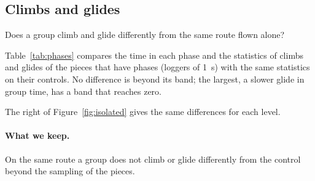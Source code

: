 \subsection{Climbs and glides}\label{sec:phases}

Does a group climb and glide differently from the same route flown alone?

Table~\ref{tab:phases} compares the time in each phase and the statistics of climbs and glides of the
pieces that have phases (loggers of 1~s) with the same statistics on their controls. No difference is
beyond its band; the largest, a slower glide in group time, has a band that reaches zero.

\begin{table}
\centering\small

\caption{Climbs and glides of group time and of the same route flown alone, both wing levels
together, on \IsoPhasePieces{} pieces of group time with phases and \IsoPhaseSegments{} matched segments; the difference group minus control with its 5--95\% band. Times are shares of the time
flown, in \%, and their differences are in percentage points.}
\label{tab:phases}
\end{table}

The right of Figure~\ref{fig:isolated} gives the same differences for each level.

\paragraph{What we keep.} On the same route a group does not climb or glide differently from the control
beyond the sampling of the pieces.
